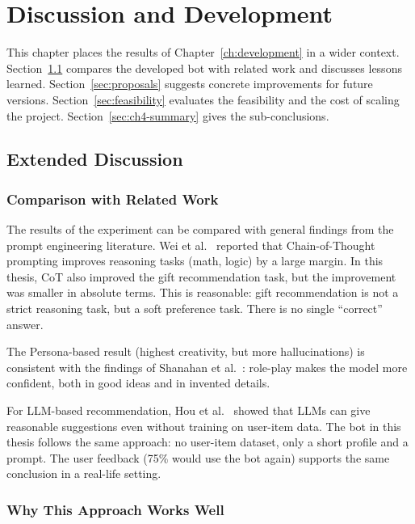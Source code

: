 \chapter{Discussion and Development}
\label{ch:discussion}

This chapter places the results of Chapter~\ref{ch:development} in a wider context. Section~\ref{sec:ext-discussion} compares the developed bot with related work and discusses lessons learned. Section~\ref{sec:proposals} suggests concrete improvements for future versions. Section~\ref{sec:feasibility} evaluates the feasibility and the cost of scaling the project. Section~\ref{sec:ch4-summary} gives the sub-conclusions.

\section{Extended Discussion}
\label{sec:ext-discussion}

\subsection{Comparison with Related Work}

The results of the experiment can be compared with general findings from the prompt engineering literature. Wei et al.~\cite{wei2022chain} reported that Chain-of-Thought prompting improves reasoning tasks (math, logic) by a large margin. In this thesis, CoT also improved the gift recommendation task, but the improvement was smaller in absolute terms. This is reasonable: gift recommendation is not a strict reasoning task, but a soft preference task. There is no single ``correct'' answer.

The Persona-based result (highest creativity, but more hallucinations) is consistent with the findings of Shanahan et al.~\cite{shanahan2023role}: role-play makes the model more confident, both in good ideas and in invented details.

For LLM-based recommendation, Hou et al.~\cite{hou2024large} showed that LLMs can give reasonable suggestions even without training on user-item data. The bot in this thesis follows the same approach: no user-item dataset, only a short profile and a prompt. The user feedback (75\% would use the bot again) supports the same conclusion in a real-life setting.

\subsection{Why This Approach Works Well}

